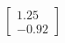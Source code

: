 \documentclass[preview]{standalone}
\begin{document}
\begin{align*}
\begin{bmatrix} 1.25 \\ -0.92 \end{bmatrix}
\end{align*}
\end{document}
